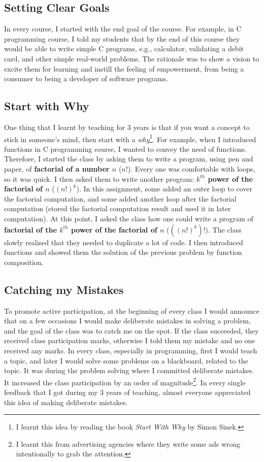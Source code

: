 \documentclass[a4paper]{article}
\begin{document}
\subsection{Setting Clear Goals}
In every course, I started with the end goal of the course. For example, 
in C programming course, I told my students that by the end of this 
course they would be 
able to write simple C programs, e.g., calculator, 
validating a debit card, and other simple real-world problems. The rationale was 
to show a vision to excite them 
for learning and instill the feeling of empowerment, from
being a consumer to being a developer of software programs.


\subsection{Start with Why}
One thing that I learnt by teaching for 3 years is that if you want a concept 
to stick in someone's mind, then start with a \textit{why}\footnote{I learnt this idea by reading the book 
\textit{Start With Why} by Simon Sinek.}. For example, when I introduced functions 
in C programming course, I wanted to convey the need of functions. Therefore, I started the class by 
asking them to write a program, using pen and paper, of \textbf{factorial of a number $n$} ($n!$). 
Every one was comfortable with loops, so it was quick. I then asked them to write 
another program: \textbf{$k^{th}$ power of the factorial of $n$} ($(n!)^k$). 
In this assignment, some added an outer loop to cover the factorial computation, 
and some added another loop after the factorial computation (stored the factorial 
computation result and used it in later computation). 
At this point, I asked the class 
how one could write a program of \textbf{factorial of 
the $k^{th}$ power of the factorial of $n$} ($((n!)^k)!$). The class slowly realised 
that they needed to duplicate a lot of code. I then introduced functions 
and showed them the solution of the previous problem by function composition.


\subsection{Catching my Mistakes}
To promote active participation, at the beginning of every class I would announce that 
on a few occasions I would make deliberate mistakes in solving a problem, and the
goal of the class was to catch me on the spot.
If the class succeeded, they received  
class participation marks, otherwise I told them my 
mistake and no one received any marks.
In every class, especially in programming, 
first I would teach a topic, and later I would solve some problems on 
a blackboard, related to the topic. 
It was during the problem solving where I committed deliberate mistakes.
It increased the class participation by an order of 
magnitude\footnote{I learnt this 
from advertising agencies where they write some ads wrong 
intentionally to grab the attention.}. In every single 
feedback that I got during my 3 years of teaching, 
almost everyone appreciated this idea of making deliberate mistakes. 
\end{document}
